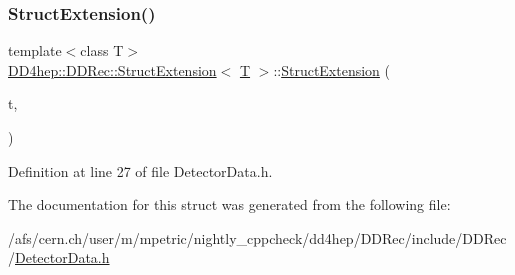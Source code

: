 \subsubsection{\texorpdfstring{Struct\+Extension()}{StructExtension()}\hspace{0.1cm}{\footnotesize\ttfamily [5/5]}}
{\footnotesize\ttfamily template$<$class T$>$ \\
\hyperlink{struct_d_d4hep_1_1_d_d_rec_1_1_struct_extension}{D\+D4hep\+::\+D\+D\+Rec\+::\+Struct\+Extension}$<$ \hyperlink{class_t}{T} $>$\+::\hyperlink{struct_d_d4hep_1_1_d_d_rec_1_1_struct_extension}{Struct\+Extension} (\begin{DoxyParamCaption}\item[{const \hyperlink{struct_d_d4hep_1_1_d_d_rec_1_1_struct_extension}{Struct\+Extension}$<$ \hyperlink{class_t}{T} $>$ \&}]{t,  }\item[{const \hyperlink{class_d_d4hep_1_1_geometry_1_1_det_element}{Geometry\+::\+Det\+Element} \&}]{ }\end{DoxyParamCaption})\hspace{0.3cm}{\ttfamily [inline]}}



Definition at line 27 of file Detector\+Data.\+h.



The documentation for this struct was generated from the following file\+:\begin{DoxyCompactItemize}
\item 
/afs/cern.\+ch/user/m/mpetric/nightly\+\_\+cppcheck/dd4hep/\+D\+D\+Rec/include/\+D\+D\+Rec/\hyperlink{_detector_data_8h}{Detector\+Data.\+h}\end{DoxyCompactItemize}
